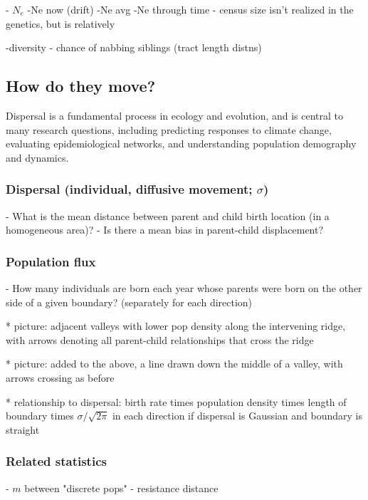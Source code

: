 \documentclass{ar-1col}
\begin{document}
        

        - $N_e$
        	-Ne now (drift)
	-Ne avg
	-Ne through time
		- census size isn't realized in the genetics, but is relatively
	
	-diversity - chance of nabbing siblings (tract length distns)

\subsection{How do they move?}
Dispersal is a fundamental process in ecology and evolution, 
and is central to many research questions, 
including predicting responses to climate change,
evaluating epidemiological networks, 
and understanding population demography and dynamics.


\subsubsection{Dispersal (individual, diffusive movement; $\sigma$)}

        - What is the mean distance between parent and child birth location (in a homogeneous area)?
        - Is there a mean bias in parent-child displacement?

\subsubsection{Population flux}

        - How many individuals are born each year whose parents were born on the other side of a given boundary?
            (separately for each direction)

            * picture: adjacent valleys with lower pop density along the intervening ridge,
                with arrows denoting all parent-child relationships that cross the ridge 

            * picture: added to the above, a line drawn down the middle of a valley, with arrows crossing as before

            * relationship to dispersal: birth rate times population density times length of boundary times $\sigma/\sqrt{2\pi}$ in each direction 
                if dispersal is Gaussian and boundary is straight

\subsubsection{Related statistics}

        - $m$ between "discrete pops"
        - resistance distance
\end{document}
